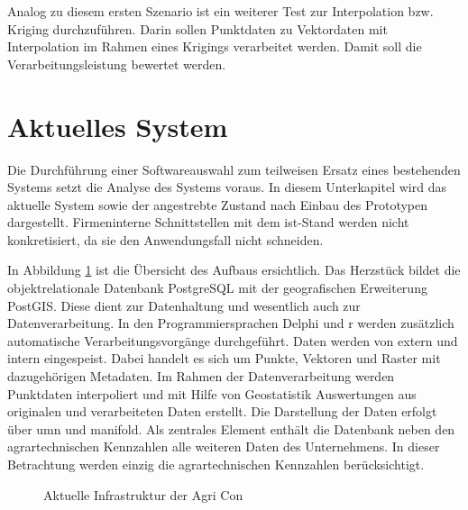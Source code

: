 Analog zu diesem ersten Szenario ist ein weiterer Test zur Interpolation bzw. Kriging durchzuführen.
Darin sollen Punktdaten zu Vektordaten mit Interpolation im Rahmen eines Krigings verarbeitet werden.
Damit soll die Verarbeitungsleistung bewertet werden.


\section{Aktuelles System}
\label{IstStand}
Die Durchführung einer Softwareauswahl zum teilweisen Ersatz eines bestehenden Systems setzt die Analyse des Systems voraus.
In diesem Unterkapitel wird das aktuelle System sowie der angestrebte Zustand nach Einbau des Prototypen dargestellt.
Firmeninterne Schnittstellen mit dem ist-Stand werden nicht konkretisiert, da sie den Anwendungsfall nicht schneiden.

In Abbildung \ref{fig:iststand} ist die Übersicht des Aufbaus ersichtlich.
Das Herzstück bildet die objektrelationale Datenbank PostgreSQL mit der geografischen Erweiterung PostGIS.
Diese dient zur Datenhaltung und wesentlich auch zur Datenverarbeitung.
In den Programmiersprachen Delphi und \Gls{r} werden zusätzlich automatische Verarbeitungsvorgänge durchgeführt.
Daten werden von extern und intern eingespeist.
Dabei handelt es sich um Punkte, Vektoren und Raster mit dazugehörigen Metadaten.
Im Rahmen der Datenverarbeitung werden Punktdaten interpoliert und mit Hilfe von Geostatistik Auswertungen aus originalen und verarbeiteten Daten erstellt.
Die Darstellung der Daten erfolgt über \Gls{umn} und \Gls{manifold}.
Als zentrales Element enthält die Datenbank neben den agrartechnischen Kennzahlen alle weiteren Daten des Unternehmens. In dieser Betrachtung werden einzig die agrartechnischen Kennzahlen berücksichtigt.
\begin{figure}[h]
\centering

\caption[Aktuelle Infrastruktur der Agri Con]{Aktuelle Infrastruktur der Agri Con}
\label{fig:iststand}
\end{figure}
%
\label{iststand-vorgaenge}

